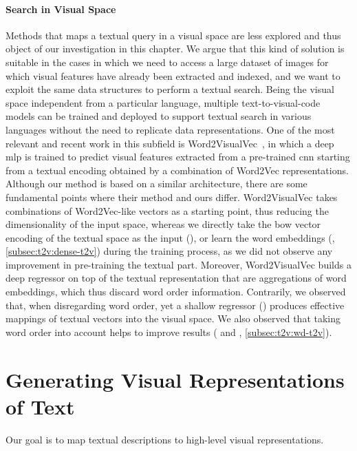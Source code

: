 \paragraph{Search in Visual Space}
Methods that maps a textual query in a visual space are less explored and thus object of our investigation in this chapter.
We argue that this kind of solution is suitable in the cases in which we need to access a large dataset of images for which visual features have already been extracted and indexed, and we want to exploit the same data structures to perform a textual search.
Being the visual space independent from a particular language, multiple text-to-visual-code models can be trained and deployed to support textual search in various languages without the need to replicate data representations.
One of the most relevant and recent work in this subfield is Word2VisualVec~\cite{dong2018predicting}, in which a deep \gls{mlp} is trained to predict visual features extracted from a pre-trained \gls{cnn} starting from a textual encoding obtained by a combination of Word2Vec representations.
Although our method is based on a similar architecture, there are some fundamental points where their method and ours differ.
Word2VisualVec takes combinations of Word2Vec-like vectors as a starting point, thus reducing the dimensionality of the input space, whereas we directly take the \acrlong{bow} vector encoding of the textual space as the input (\sparsettv{}), or learn the word embeddings (\densettv{}, \ref{subsec:t2v:dense-t2v}) during the training process, as we did not observe any improvement in pre-training the textual part.
Moreover, Word2VisualVec builds a deep regressor on top of the textual representation that are aggregations of word embeddings, which thus discard word order information.
Contrarily, we observed that, when disregarding word order, yet a shallow regressor (\sparsettv{}) produces effective mappings of textual vectors into the visual space.
We also observed that taking word order into account helps to improve results (\densettv{} and \widedeepttv{}, \ref{subsec:t2v:wd-t2v}).


\section{Generating Visual Representations of Text}
\label{sec:t2v:method}

Our goal is to map textual descriptions to high-level visual representations.

